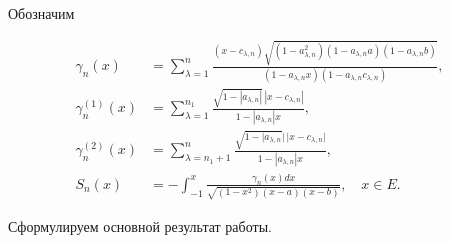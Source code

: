 \addtocounter{note}{-1}





Обозначим


\begin{align*}


\gamma_n(x)&=\sum^n_{\lambda=1}


\frac{(x-c_{\lambda,n})\sqrt{(1-a^2_{\lambda,n})


(1-a_{\lambda,n}a)(1-a_{\lambda,n}b)}}


{(1-a_{\lambda,n}x)(1-a_{\lambda,n}c_{\lambda,n})},\\


\gamma^{(1)}_n(x)&=\sum^{n_1}_{\lambda=1}


\frac{\sqrt{1-|a_{\lambda,n}|}\,|x-c_{\lambda,n}|}


{1-|a_{\lambda,n}|x},\\


\gamma^{(2)}_n(x)&=\sum^n_{\lambda=n_1+1}


\frac{\sqrt{1-|a_{\lambda,n}}|\,|x-c_{\lambda,n}|}


{1-|a_{\lambda,n}|x},\\


S_n(x)&=-\int^x_{-1}\frac{\gamma_n(x)dx}


{\sqrt{(1-x^2)(x-a)(x-b)}},\quad x\in E.


\end{align*}





Сформулируем основной результат работы.





